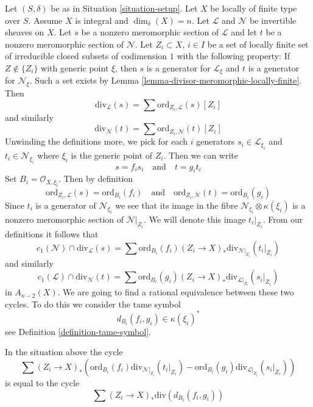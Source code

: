 \noindent
Let $(S, \delta)$ be as in Situation \ref{situation-setup}.
Let $X$ be locally of finite type over $S$. Assume
$X$ is integral and $\dim_\delta(X) = n$.
Let $\mathcal{L}$ and $\mathcal{N}$ be invertible sheaves on $X$.
Let $s$ be a nonzero meromorphic section of $\mathcal{L}$ and
let $t$ be a nonzero meromorphic section of $\mathcal{N}$.
Let $Z_i \subset X$, $i \in I$ be a set of locally finite set of irreducible
closed subsets of codimension $1$ with the following property:
If $Z \not \in \{Z_i\}$ with generic point $\xi$, then $s$ is a generator
for $\mathcal{L}_\xi$ and $t$ is a generator for $\mathcal{N}_\xi$.
Such a set exists by Lemma \ref{lemma-divisor-meromorphic-locally-finite}.
Then
$$
\text{div}_\mathcal{L}(s) = \sum \text{ord}_{Z_i, \mathcal{L}}(s) [Z_i]
$$
and similarly
$$
\text{div}_\mathcal{N}(t) = \sum \text{ord}_{Z_i, \mathcal{N}}(t) [Z_i]
$$
Unwinding the definitions more, we pick for each $i$ generators
$s_i \in \mathcal{L}_{\xi_i}$ and $t_i \in \mathcal{N}_{\xi_i}$
where $\xi_i$ is the generic point of $Z_i$. Then we can write
$$
s = f_i s_i
\quad\text{and}\quad
t = g_i t_i
$$
Set $B_i = \mathcal{O}_{X, \xi_i}$. Then by definition
$$
\text{ord}_{Z_i, \mathcal{L}}(s) = \text{ord}_{B_i}(f_i)
\quad\text{and}\quad
\text{ord}_{Z_i, \mathcal{N}}(t) = \text{ord}_{B_i}(g_i)
$$
Since $t_i$ is a generator of $\mathcal{N}_{\xi_i}$ we see that
its image in the fibre $\mathcal{N}_{\xi_i} \otimes \kappa(\xi_i)$
is a nonzero meromorphic section of $\mathcal{N}|_{Z_i}$. We will denote
this image $t_i|_{Z_i}$. From our definitions it follows that
$$
c_1(\mathcal{N}) \cap \text{div}_\mathcal{L}(s) =
\sum \text{ord}_{B_i}(f_i)
(Z_i \to X)_*\text{div}_{\mathcal{N}|_{Z_i}}(t_i|_{Z_i})
$$
and similarly
$$
c_1(\mathcal{L}) \cap \text{div}_\mathcal{N}(t) =
\sum \text{ord}_{B_i}(g_i)
(Z_i \to X)_*\text{div}_{\mathcal{L}|_{Z_i}}(s_i|_{Z_i})
$$
in $A_{n - 2}(X)$. We are going to find a rational equivalence between
these two cycles. To do this we consider the tame symbol
$$
d_{B_i}(f_i, g_i) \in \kappa(\xi_i)^*
$$
see Definition \ref{definition-tame-symbol}.

\begin{lemma}
\label{lemma-key-formula}
In the situation above the cycle
$$
\sum
(Z_i \to X)_*\left(
\text{ord}_{B_i}(f_i) \text{div}_{\mathcal{N}|_{Z_i}}(t_i|_{Z_i}) -
\text{ord}_{B_i}(g_i) \text{div}_{\mathcal{L}|_{Z_i}}(s_i|_{Z_i}) \right)
$$
is equal to the cycle
$$
\sum (Z_i \to X)_*\text{div}(d_{B_i}(f_i, g_i))
$$
\end{lemma}

